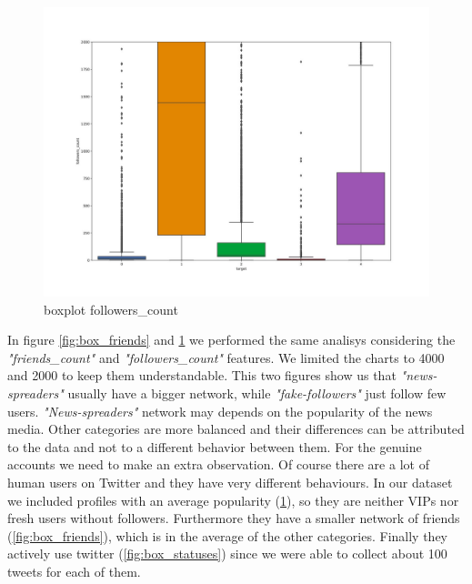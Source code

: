 \begin{figure}
	\centering
	\includegraphics[width=\columnwidth]{chapter3/figure/boxplot_followers.jpg}
	\caption{boxplot followers\_count}
	\label{fig:box_followers}
\end{figure}
In figure \ref{fig:box_friends} and \ref{fig:box_followers} we performed the same analisys considering the \emph{"friends\_count"} and \emph{"followers\_count"} features. We limited the charts to 4000 and 2000 to keep them understandable. This two figures show us that \emph{"news-spreaders"} usually have a bigger network, while \emph{"fake-followers"} just follow few users. \emph{"News-spreaders"} network may depends on the popularity of the news media. Other categories are more balanced and their differences can be attributed to the data and not to a different behavior between them. For the genuine accounts we need to make an extra observation. Of course there are a lot of human users on Twitter and they have very different behaviours. In our dataset we included profiles with an average popularity (\ref{fig:box_followers}), so they are neither VIPs nor fresh users without followers. Furthermore they have a smaller network of friends (\ref{fig:box_friends}), which is in the average of the other categories. Finally they actively use twitter (\ref{fig:box_statuses}) since we were able to collect about 100 tweets for each of them. 